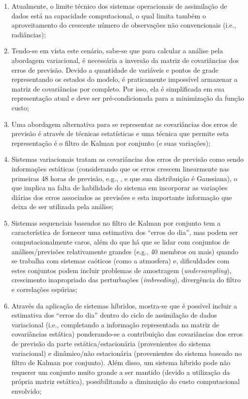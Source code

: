 \begin{enumerate}
    \item Atualmente, o limite técnico dos sistemas operacionais de assimilação de dados está na capacidade computacional, o qual limita também o aproveitamento do crescente número de observações não convencionais (i.e., radiâncias);
    \item Tendo-se em vista este cenário, sabe-se que para calcular a análise pela abordagem variacional, é necessária a inversão da matriz de covariâncias dos erros de previsão. Devido a quantidade de variáveis e pontos de grade representando os estados do modelo, é praticamente impossível armazenar a matriz de covariâncias por completo. Por isso, ela é simplificada em sua representação atual e deve ser pré-condicionada para a minimização da função custo;
    \item Uma abordagem alternativa para se representar as covariâncias dos erros de previsão é através de técnicas estatísticas e uma técnica que permite esta representação é o filtro de Kalman por conjunto (e suas variações);
    \item Sistemas variacionais tratam as covariâncias dos erros de previsão como sendo informações estáticas (considerando que os erros crescem linearmente nas primeiras 48 horas de previsão, e.g., , e que sua distribuição é Gaussiana), o que implica na falta de habilidade do sistema em incorporar as variações diárias dos erros associados as previsões e esta importante informação que deixa de ser utilizada pela análise;
    \item Sistemas sequenciais baseados no filtro de Kalman por conjunto tem a característica de fornecer uma estimativa dos ``erros do dia'', mas podem ser computacionalmente caros, além do que há que se lidar com conjuntos de análises/previsões relativamente grandes (e.g., 40 membros ou mais) quando se trabalha com sistemas caóticos (como a atmosfera) e, dificuldades com estes conjuntos podem incluir problemas de amostragem (\textit{undersampling}), crescimento inapropriado das perturbações (\textit{imbreeding}), divergência do filtro e correlações espúrias;
    \item Através da aplicação de sistemas híbridos, mostra-se que é possível incluir a estimativa dos ``erros do dia'' dentro do ciclo de assimilação de dados variacional (i.e., completando a informação representada na matriz de covariâncias estática) ponderando-se a contribuição das covariâncias dos erros de previsão da parte estática/estacionária (provenientes do sistema variacional) e dinâmico/não estacionária (provenientes do sistema baseado no filtro de Kalman por conjunto). Além disso, um sistema híbrido pode não requerer um conjunto muito grande a ser mantido (devido a utilização da própria matriz estática), possibilitando a diminuição do custo computacional envolvido;

\end{enumerate}
